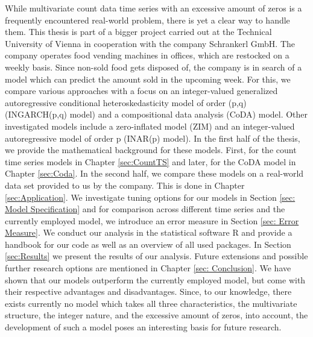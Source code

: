While multivariate count data time series with an excessive amount of zeros is a frequently encountered real-world problem, there is yet a clear way to handle them. This thesis is part of a bigger project carried out at the Technical University of Vienna in cooperation with the company Schrankerl GmbH. The company operates food vending machines in offices, which are restocked on a weekly basis. Since non-sold food gets disposed of, the company is in search of a model which can predict the amount sold in the upcoming week. For this, we compare various approaches with a focus on an integer-valued generalized autoregressive conditional heteroskedasticity model of order (p,q) (INGARCH(p,q) model) and a compositional data analysis (CoDA) model. Other investigated models include a zero-inflated model (ZIM) and an integer-valued autoregressive model of order p (INAR(p) model). In the first half of the thesis, we provide the mathematical background for these models. First, for the count time series models in Chapter \ref{sec:CountTS} and later, for the CoDA model in Chapter \ref{sec:Coda}. In the second half, we compare these models on a real-world data set provided to us by the company. This is done in Chapter \ref{sec:Application}. We investigate tuning options for our models in Section \ref{sec: Model Specification} and for comparison across different time series and the currently employed model, we introduce an error measure in Section \ref{sec: Error Measure}. We conduct our analysis in the statistical software R and provide a handbook for our code as well as an overview of all used packages. In Section \ref{sec:Results} we present the results of our analysis. Future extensions and possible further research options are mentioned in Chapter \ref{sec: Conclusion}. We have shown that our models outperform the currently employed model, but come with their respective advantages and disadvantages. Since, to our knowledge, there exists currently no model which takes all three characteristics, the multivariate structure, the integer nature, and the excessive amount of zeros, into account, the development of such a model poses an interesting basis for future research.

